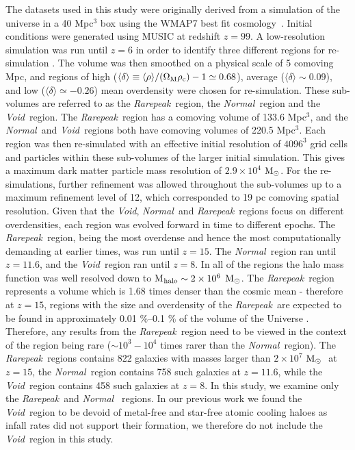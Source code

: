 \documentclass[graphics, twocolumn, usenatbib]{mn2e}
\newcommand{\msolar} {$\rm{M_{\odot}}~$}
\newcommand{\msolarc} {$\rm{M_{\odot}}$}
\newcommand{\rarepeak} {\textit{Rarepeak~}}
\newcommand{\normal} {\textit{Normal~}}
\newcommand{\void} {\textit{Void~}}
\newcommand{\voidc} {\textit{Void}}
\begin{document}
The datasets used in this study were originally derived from a simulation of the universe in a 40 Mpc$^3$
box using the WMAP7 best fit cosmology~\citep{Komatsu_2011}.
Initial conditions were generated using
MUSIC \citep{Hahn_2011} at redshift $z = 99$. A low-resolution simulation was run until $z = 6$ in order to
identify three different regions for re-simulation \citep{Chen_2014}. The volume was then smoothed
on a physical scale of 5 comoving Mpc, and regions of high
($\langle\delta\rangle \equiv \langle\rho\rangle/(\Omega_{\rm M} \rho_{\rm c}) - 1 \simeq 0.68$),
average ($\langle\delta\rangle \sim 0.09$), and low ($\langle\delta\rangle \simeq -0.26$)
mean overdensity were chosen for re-simulation. These sub-volumes are referred to as the
\rarepeak region, the \normal region  and the \void region. The \rarepeak region has a comoving
volume of 133.6 Mpc$^3$, and the \normal and \void regions both have comoving volumes of 220.5
Mpc$^3$. Each region was then re-simulated with an effective initial resolution of $4096^3$ grid
cells and particles within these sub-volumes of the larger initial simulation. This gives a maximum
dark matter particle mass resolution of $2.9 \times 10^4$ \msolarc. For the re-simulations, further refinement was allowed throughout the sub-volumes up
to a maximum refinement level of 12, which corresponded to 19 pc comoving spatial resolution. Given
that the
\voidc, \normal and \rarepeak regions focus on different overdensities, each region was evolved forward in time to
different epochs. The \rarepeak region, being the most overdense and hence the most
computationally demanding at earlier times, was run until $z = 15$. The \normal region ran until $z =
11.6$, and the \void region ran until $z = 8$. In all of the regions the halo mass function was 
well resolved down to M$_{\rm halo} \sim 2 \times 10^6$ \msolarc. The \rarepeak region represents a
volume which is 1.68 times denser than the cosmic mean - therefore at $z = 15$, regions with the
size and overdensity of the \rarepeak are expected to be found in approximately 0.01 \%–0.1 \%
of the volume of the Universe \citep{Wise_2019}. Therefore, any results from the
\rarepeak region need to be viewed in the context of the region being rare ($\sim 10^3 - 10^4$ times rarer than the \normal region).
The \rarepeak regions contains 822 galaxies with masses larger than $2 \times 10^7$ \msolar
at $z = 15$, the \normal region contains 758 such galaxies at $z = 11.6$, while the \void region
contains 458 such galaxies at $z = 8$. In this study, we examine only the \rarepeak and \normal
regions. In our previous work
\citep{Wise_2019, Regan_2020} we found the \void region to be devoid of metal-free and
star-free atomic cooling haloes as infall rates
did not support their formation, we therefore do not include the \void region in this study. 
\end{document}
